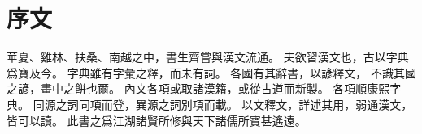 \chapter*{序文}
華夏、雞林、扶桑、南越之中，書生齊嘗與漢文流通。
夫欲習漢文也，古以字典爲寶及今。
字典雖有字彙之釋，而未有詞。
各國有其辭書，以諺釋文，
不識其國之諺，畫中之餅也爾。
內文各項或取諸漢籍，或從古道而新製。
各項順康熙字典。
同源之詞同項而登，異源之詞別項而載。
以文釋文，詳述其用，弱通漢文，皆可以讀。
此書之爲江湖諸賢所修與天下諸儒所寶甚遙遠。
